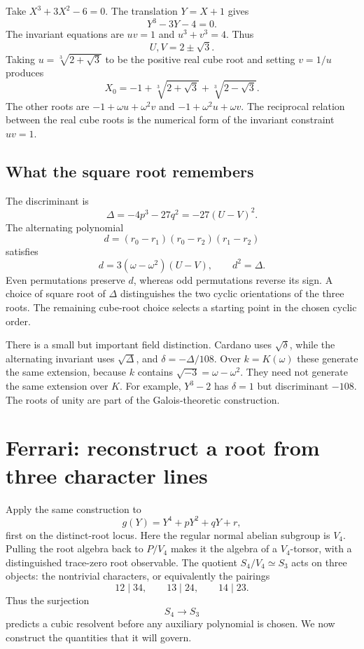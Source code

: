 \documentclass[11pt]{article}
\theoremstyle{remark}
\begin{document}
Take \(X^3+3X^2-6=0\). The translation \(Y=X+1\) gives
\[
Y^3-3Y-4=0.
\]
The invariant equations are \(uv=1\) and \(u^3+v^3=4\). Thus
\[
U,V=2\pm\sqrt3.
\]
Taking \(u=\sqrt[3]{2+\sqrt3}\) to be the positive real cube root and setting \(v=1/u\) produces
\[
X_0=-1+\sqrt[3]{2+\sqrt3}+\sqrt[3]{2-\sqrt3}.
\]
The other roots are \(-1+\omega u+\omega^2v\) and \(-1+\omega^2u+\omega v\). The reciprocal relation between the real cube roots is the numerical form of the invariant constraint \(uv=1\).

\subsection{What the square root remembers}

The discriminant is
\[
\Delta=-4p^3-27q^2=-27(U-V)^2.
\]
The alternating polynomial
\[
d=(r_0-r_1)(r_0-r_2)(r_1-r_2)
\]
satisfies
\begin{equation}
d=3(\omega-\omega^2)(U-V),\qquad d^2=\Delta.
\label{eq:cubic-discriminant}
\end{equation}
Even permutations preserve \(d\), whereas odd permutations reverse its sign. A choice of square root of \(\Delta\) distinguishes the two cyclic orientations of the three roots. The remaining cube-root choice selects a starting point in the chosen cyclic order.

There is a small but important field distinction. Cardano uses \(\sqrt\delta\), while the alternating invariant uses \(\sqrt\Delta\), and \(\delta=-\Delta/108\). Over \(k=K(\omega)\) these generate the same extension, because \(k\) contains \(\sqrt{-3}=\omega-\omega^2\). They need not generate the same extension over \(K\). For example, \(Y^3-2\) has \(\delta=1\) but discriminant \(-108\). The roots of unity are part of the Galois-theoretic construction.

\section{Ferrari: reconstruct a root from three character lines}
\label{ferrari:section}

Apply the same construction to
\[
g(Y)=Y^4+pY^2+qY+r,
\]
first on the distinct-root locus. Here the regular normal abelian subgroup is \(V_4\). Pulling the root algebra back to \(P/V_4\) makes it the algebra of a \(V_4\)-torsor, with a distinguished trace-zero root observable. The quotient \(S_4/V_4\simeq S_3\) acts on three objects: the nontrivial characters, or equivalently the pairings
\begin{equation}
12\mid34,\qquad13\mid24,\qquad14\mid23.
\label{eq:pairings}
\end{equation}
Thus the surjection
\begin{equation}
S_4\longrightarrow S_3
\label{eq:quartic-quotient}
\end{equation}
predicts a cubic resolvent before any auxiliary polynomial is chosen. We now construct the quantities that it will govern.
\end{document}
